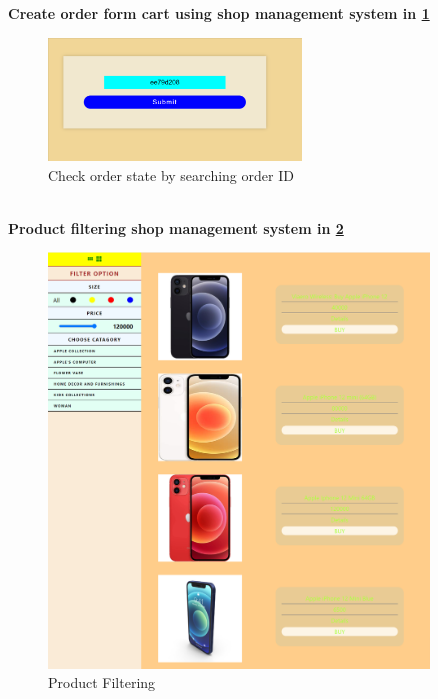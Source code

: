 \newpage
\textbf{Create order form cart using shop management system in \ref{fig:fig6.2.14}}\\
\begin{figure}[ht]
    \centering  
    \includegraphics[width=0.6\textwidth, height=0.1\textheight]{designs/inquiry_order_details_by_order_id.png}    
    \caption{Check order state by searching order ID}
    \label{fig:fig6.2.14}
\end{figure}
\\[1cm]
\textbf{Product filtering shop management system in \ref{fig:fig 6.2.15}}\\
\begin{figure}[ht]
    \centering  
    \includegraphics[width=0.9\textwidth,height=0.5\textheight]{designs/product-filtering-options.png}    
    \caption{Product Filtering}
    \label{fig:fig 6.2.15}
\end{figure}

